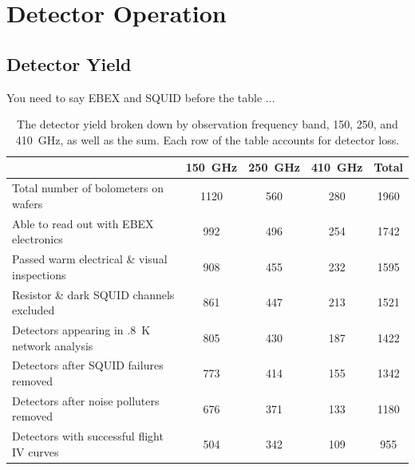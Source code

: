 \chapter{Detector Operation}
\label{operation_chapter}

\section{Detector Yield}
\label{sec:yield}

You need to say \ac{EBEX} and \ac{SQUID} before the table ...

\begin{table}[ht!]
\begin{center}
\begin{tabular}{l|c|c|c|c}
  & 150~GHz & 250~GHz & 410~GHz & Total \\
\hline Total number of bolometers on wafers & 1120 & 560 & 280 & 1960 \\
\hline Able to read out with \ac{EBEX} electronics & 992 & 496 & 254 & 1742 \\
\hline Passed warm electrical \& visual inspections & 908 & 455 & 232 & 1595 \\
\hline Resistor \& dark \ac{SQUID} channels excluded & 861 & 447 & 213 & 1521 \\
\hline Detectors appearing in .8~K network analysis & 805 & 430 & 187 & 1422 \\
\hline Detectors after SQUID failures removed & 773 & 414 & 155 & 1342 \\
\hline Detectors after noise polluters removed & 676 & 371 & 133 & 1180 \\
\hline Detectors with successful flight IV curves & 504 & 342 & 109 & 955 \\
\hline
\end{tabular}
\end{center}
\caption{The detector yield broken down by observation frequency band, 150, 250, and 410~GHz, as well as the sum. Each row of the table accounts for detector loss.}
\label{yield_table}
\end{table}

